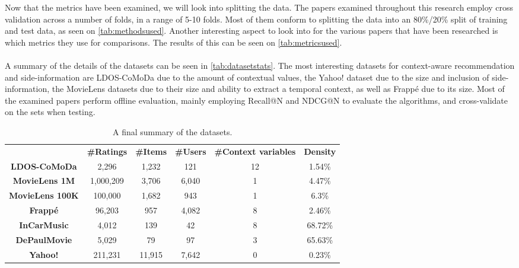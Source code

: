Now that the metrics have been examined, we will look into splitting the data.
The papers examined throughout this research employ cross validation across a number of folds, in a range of 5-10 folds.
Most of them conform to splitting the data into an 80\%/20\% split of training and test data, as seen on \autoref{tab:methodsused}.
Another interesting aspect to look into for the various papers that have been researched is which metrics they use for comparisons.
The results of this can be seen on \autoref{tab:metricsused}.
\\\\
A summary of the details of the datasets can be seen in \autoref{tab:datasetstats}.
The most interesting datasets for context-aware recommendation and side-information are LDOS-CoMoDa due to the amount of contextual values, the Yahoo! dataset due to the size and inclusion of side-information, the MovieLens datasets due to their size and ability to extract a temporal context, as well as Frappé due to its size.
Most of the examined papers perform offline evaluation, mainly employing Recall@N and NDCG@N to evaluate the algorithms, and cross-validate on the sets when testing.
\begin{table*}[]\centering
    \caption{A final summary of the datasets.}\label{tab:datasetstats}
    \scriptsize
    \begin{tabular}{cccccc}\toprule
        &\textbf{\#Ratings} & \textbf{\#Items} & \textbf{\#Users} & \textbf{\#Context variables} & \textbf{Density}\\\cmidrule{1-6}
        \textbf{LDOS-CoMoDa} & 2,296 & 1,232 & 121 & 12 & 1.54\% \\\cmidrule{1-6}
        \textbf{MovieLens 1M} & 1,000,209 & 3,706 & 6,040 & 1 & 4.47\% \\\cmidrule{1-6}
        \textbf{MovieLens 100K} & 100,000 & 1,682 & 943 & 1 & 6.3\% \\\cmidrule{1-6}
        \textbf{Frappé} & 96,203 & 957 & 4,082 & 8 & 2.46\% \\\cmidrule{1-6}
        \textbf{InCarMusic} & 4,012 & 139 & 42 & 8 & 68.72\% \\\cmidrule{1-6}
        \textbf{DePaulMovie} & 5,029 & 79 & 97 & 3 & 65.63\% \\\cmidrule{1-6}
        \textbf{Yahoo!} & 211,231 & 11,915 & 7,642 & 0 & 0.23\% \\\cmidrule{1-6}
    \bottomrule
    \end{tabular}
\end{table*}
